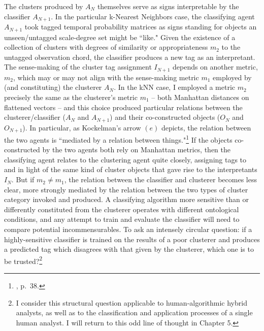 The clusters produced by $A_N$ themselves serve as signs interpretable by the classifier $A_{N+1}$.  In the particular k-Nearest Neighbors case, the classifying agent $A_{N+1}$ took tagged temporal probability matrices as signs standing for objects an unseen/untagged scale-degree set might be ``like."  Given the existence of a collection of clusters with degrees of similarity or appropriateness $m_2$ to the untagged observation chord, the classifier produces a new tag as an interpretant.  The sense-making of the cluster tag assignment $I_{N+1}$ depends on another metric, $m_2$, which may or may not align with the sense-making metric $m_1$ employed by (and constituting) the clusterer $A_{N}$.  In the kNN case, I employed a metric $m_2$ precisely the same as the clusterer's metric $m_1$ -- both Manhattan distances on flattened vectors -- and this choice produced particular relations between the clusterer/classifier ($A_N$ and $A_{N+1}$) and their co-constructed objects ($O_N$ and $O_{N+1}$).  In particular, as Kockelman's arrow $(e)$ depicts, the relation between the two agents is ``mediated by a relation between things."\footnote{\cite{kockelman2013}, p.\ 38.}  If the objects co-constructed by the two agents both rely on Manhattan metrics, then the classifying agent relates to the clustering agent quite closely, assigning tags to and in light of the same kind of cluster objects that gave rise to the interpretants $I_N$.  But if $m_2 \neq m_1$, the relation between the classifier and clusterer becomes less clear, more strongly mediated by the relation between the two types of cluster category invoked and produced.  A classifying algorithm more sensitive than or differently constituted from the clusterer operates with different ontological conditions, and any attempt to train and evaluate the classifier will need to compare potential incommensurables.  To ask an intensely circular question: if a highly-sensitive classifier is trained on the results of a poor clusterer and produces a predicted tag which disagrees with that given by the clusterer, which one is to be trusted?\footnote{I consider this structural question applicable to human-algorithmic hybrid analysts, as well as to the classification and application processes of a single human analyst.  I will return to this odd line of thought in Chapter 5.}

